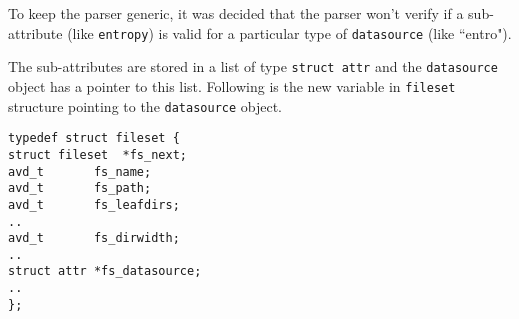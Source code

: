 To keep the parser generic, it was decided that the parser won't verify if a sub-attribute (like \verb+entropy+) is valid for a particular type of \verb+datasource+ (like ``entro"). 

The sub-attributes are stored in a list of type \verb+struct attr+ and the \verb+datasource+ object has a pointer to this list. Following is the new variable in \verb+fileset+ structure pointing to the \verb+datasource+ object.

\lstset{language=C}
\begin{lstlisting}
typedef struct fileset { 
struct fileset  *fs_next;  
avd_t       fs_name; 
avd_t       fs_path;   
avd_t       fs_leafdirs; 
..
avd_t       fs_dirwidth;
..
struct attr *fs_datasource;
..
};
\end{lstlisting}






